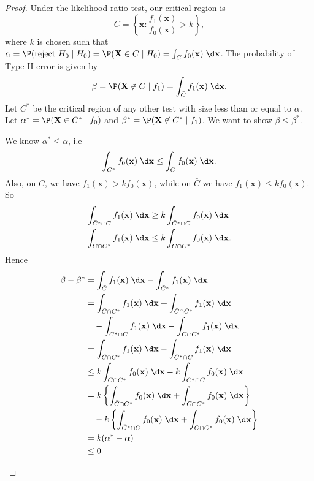 \documentclass[a4paper]{article}
\begin{document}
\begin{proof}
  Under the likelihood ratio test, our critical region is
  \[
    C = \left\{\mathbf{x}: \frac{f_1(\mathbf{x})}{f_0(\mathbf{x})} > k\right\},
  \]
  where $k$ is chosen such that $\alpha=\P(\text{reject }H_0\mid H_0) = \P(\mathbf{X}\in C\mid H_0) = \int_C f_0(\mathbf{x})\;\d \mathbf{x}$. The probability of Type II error is given by
  \[
    \beta = \P(\mathbf{X}\not\in C\mid f_1) = \int_{\bar C}f_1(\mathbf{x})\;\d \mathbf{x}.
  \]
  Let $C^*$ be the critical region of any other test with size less than or equal to $\alpha$. Let $\alpha^* = \P(\mathbf{X} \in C^*\mid f_0)$ and $\beta^* = \P(\mathbf{X}\not\in C^*\mid f_1)$. We want to show $\beta \leq \beta^*$.

  We know $\alpha^* \leq \alpha$, i.e
  \[
    \int_{C^*}f_0(\mathbf{x})\;\d \mathbf{x}\leq \int_Cf_0(\mathbf{x}) \;\d \mathbf{x}.
  \]
  Also, on $C$, we have $f_1(\mathbf{x}) > kf_0(\mathbf{x})$, while on $\bar C$ we have $f_1(\mathbf{x}) \leq kf_0(\mathbf{x})$. So
  \begin{align*}
    \int_{\bar C^*\cap C} f_1(\mathbf{x}) \;\d \mathbf{x} &\geq k\int_{\bar C^*\cap C}f_0(\mathbf{x}) \;\d \mathbf{x}\\
    \int_{\bar C\cap C^*}f_1(\mathbf{x}) \;\d \mathbf{x} &\leq k\int_{\bar C\cap C^*}f_0 (\mathbf{x})\;\d \mathbf{x}.
  \end{align*}
  Hence
  \begin{align*}
    \beta - \beta^* &= \int_{\bar C}f_1(\mathbf{x}) \;\d \mathbf{x} - \int_{\bar C^*}f_1(\mathbf{x})\;\d \mathbf{x}\\
    &= \int_{\bar C\cap C^*} f_1(\mathbf{x}) \;\d \mathbf{x} + \int_{\bar C\cap \bar C^*}f_1(\mathbf{x})\;\d \mathbf{x} \\
    &\quad - \int_{\bar C^*\cap C} f_1(\mathbf{x}) \;\d \mathbf{x} - \int_{\bar C\cap \bar C^*}f_1(\mathbf{x})\;\d \mathbf{x}\\
    &= \int_{\bar C \cap C^*}f_1(\mathbf{x})\;\d \mathbf{x} - \int_{\bar C^*\cap C}f_1(\mathbf{x})\;\d \mathbf{x}\\
    &\leq k\int_{\bar C \cap C^*}f_0(\mathbf{x})\;\d \mathbf{x} - k\int_{\bar C^*\cap C}f_0(\mathbf{x})\;\d \mathbf{x}\\
    &= k\left\{\int_{\bar C\cap C^*}f_0(\mathbf{x})\;\d \mathbf{x} + \int_{C \cap C^*}f_0(\mathbf{x})\;\d \mathbf{x}\right\} \\
    &\quad- k\left\{\int_{\bar C^*\cap C}f_0(\mathbf{x})\;\d \mathbf{x} + \int_{C\cap C^*}f_0(\mathbf{x})\;\d \mathbf{x}\right\}\\
    &= k(\alpha^* - \alpha)\\
    &\leq 0.
  \end{align*}
  \begin{center}
\end{center}
\end{proof}
\end{document}
